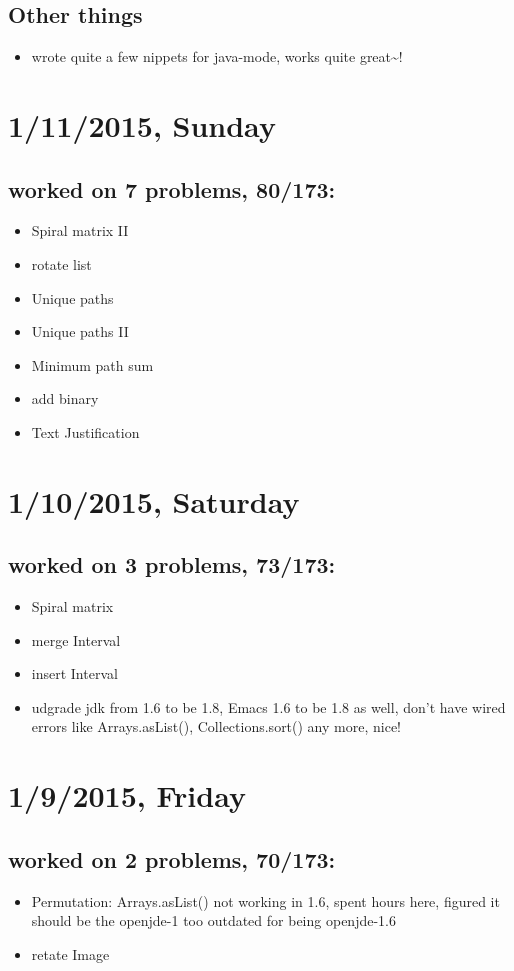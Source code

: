 \documentclass[9pt,b5paper]{article}
\begin{document}
\subsection{Other things}
\label{sec-15-2}
\begin{itemize}
\item wrote quite a few nippets for java-mode, works quite great\textasciitilde{}!
\end{itemize}
\section{1/11/2015, Sunday}
\label{sec-16}
\subsection{worked on 7 problems, 80/173:}
\label{sec-16-1}
\begin{itemize}
\item Spiral matrix II
\item rotate list
\item Unique paths
\item Unique paths II
\item Minimum path sum
\item add binary
\item Text Justification
\end{itemize}
\section{1/10/2015, Saturday}
\label{sec-17}
\subsection{worked on 3 problems, 73/173:}
\label{sec-17-1}
\begin{itemize}
\item Spiral matrix
\item merge Interval
\item insert Interval
\item udgrade jdk from 1.6 to be 1.8, Emacs 1.6 to be 1.8 as well, don't have wired errors like Arrays.asList(), Collections.sort() any more, nice!
\end{itemize}
\section{1/9/2015, Friday}
\label{sec-18}
\subsection{worked on 2 problems, 70/173:}
\label{sec-18-1}
\begin{itemize}
\item Permutation: Arrays.asList() not working in 1.6, spent hours here, figured it should be the openjde-1 too outdated for being openjde-1.6
\item retate Image
\end{itemize}
\end{document}
